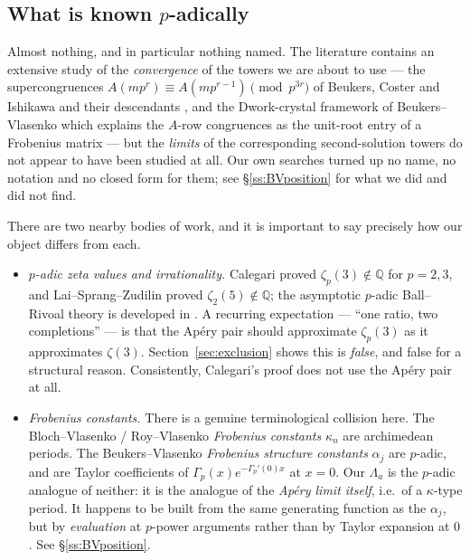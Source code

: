 \documentclass[11pt,reqno]{article}
\newcommand{\QQ}{\mathbb{Q}}
\newcommand{\Gp}{\Gamma_p}
\theoremstyle{plain}
\theoremstyle{definition}
\theoremstyle{remark}
\numberwithin{equation}{section}
\begin{document}
\subsection{What is known $p$-adically}\label{ss:known}

Almost nothing, and in particular nothing named.  The literature contains an
extensive study of the \emph{convergence} of the towers we are about to use ---
the supercongruences $A(mp^{r})\equiv A(mp^{r-1}) \pmod{p^{3r}}$ of Beukers,
Coster and Ishikawa and their descendants \cite{Supercong}, and the
Dwork-crystal framework of Beukers--Vlasenko \cite{BVdwork3} which explains the
$A$-row congruences as the unit-root entry of a Frobenius matrix --- but the
\emph{limits} of the corresponding second-solution towers do not appear to have
been studied at all.  Our own searches turned up no name, no notation and no
closed form for them; see \S\ref{ss:BVposition} for what we did and did not
find.

There are two nearby bodies of work, and it is important to say precisely how
our object differs from each.

\begin{itemize}[leftmargin=1.5em]
\item \emph{$p$-adic zeta values and irrationality.}  Calegari
  \cite{Calegari2005} proved $\zeta_p(3)\notin\QQ$ for $p=2,3$, and
  Lai--Sprang--Zudilin \cite{LSZ2025} proved $\zeta_2(5)\notin\QQ$; the
  asymptotic $p$-adic Ball--Rivoal theory is developed in
  \cite{LaiSprang2023}.  A recurring expectation --- ``one ratio, two
  completions'' --- is that the Ap\'ery pair should approximate $\zeta_p(3)$ as
  it approximates $\zeta(3)$.  Section~\ref{sec:exclusion} shows this is
  \emph{false}, and false for a structural reason.  Consistently, Calegari's
  proof does not use the Ap\'ery pair at all.
\item \emph{Frobenius constants.}  There is a genuine terminological collision
  here.  The Bloch--Vlasenko / Roy--Vlasenko \emph{Frobenius constants} $\kappa_n$
  \cite{RoyVlasenko,Kerr} are archimedean periods.  The Beukers--Vlasenko
  \emph{Frobenius structure constants} $\alpha_j$ \cite{BV2025} are $p$-adic,
  and are Taylor coefficients of $\Gp(x)e^{-\Gp'(0)x}$ at $x=0$.  Our
  $\Lambda_a$ is the $p$-adic analogue of neither: it is the analogue of the
  \emph{Ap\'ery limit itself}, i.e.\ of a $\kappa$-type period.  It happens to
  be built from the same generating function as the $\alpha_j$, but by
  \emph{evaluation} at $p$-power arguments rather than by Taylor expansion at
  $0$.  See \S\ref{ss:BVposition}.
\end{itemize}
\end{document}
